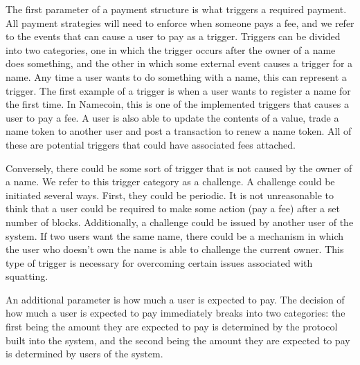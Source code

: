     The first parameter of a payment structure is what triggers a required payment. All payment strategies will need to enforce when someone pays a fee, and we refer to the events that can cause a user to pay as a trigger. Triggers can be divided into two categories, one in which the trigger occurs after the owner of a name does something, and the other in which some external event causes a trigger for a name. Any time a user wants to do something with a name, this can represent a trigger. The first example of a trigger is when a user wants to register a name for the first time. In Namecoin, this is one of the implemented triggers that causes a user to pay a fee. A user is also able to update the contents of a value, trade a name token to another user and post a transaction to renew a name token. All of these are potential triggers that could have associated fees attached. 

Conversely, there could be some sort of trigger that is not caused by the owner of a name. We refer to this trigger category as a challenge. A challenge could be initiated several ways. First, they could be periodic. It is not unreasonable to think that a user could be required to make some action (pay a fee) after a set number of blocks. Additionally, a challenge could be issued by another user of the system. If two users want the same name, there could be a mechanism in which the user who doesn't own the name is able to challenge the current owner. This type of trigger is necessary for overcoming certain issues associated with squatting. 

    An additional parameter is how much a user is expected to pay. The decision of how much a user is expected to pay immediately breaks into two categories: the first being the amount they are expected to pay is determined by the protocol built into the system, and the second being the amount they are expected to pay is determined by users of the system. 

